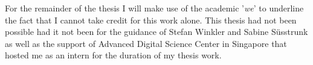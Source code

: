 For the remainder of the thesis I will make use of the academic 
'\emph{we}' to underline the fact that I cannot take credit for this 
work alone.  This thesis had not been possible had it not been for the 
guidance of Stefan Winkler and Sabine S\"usstrunk as well as the support 
of Advanced Digital Science Center in Singapore that hosted me as an 
intern for the duration of my thesis work. 
